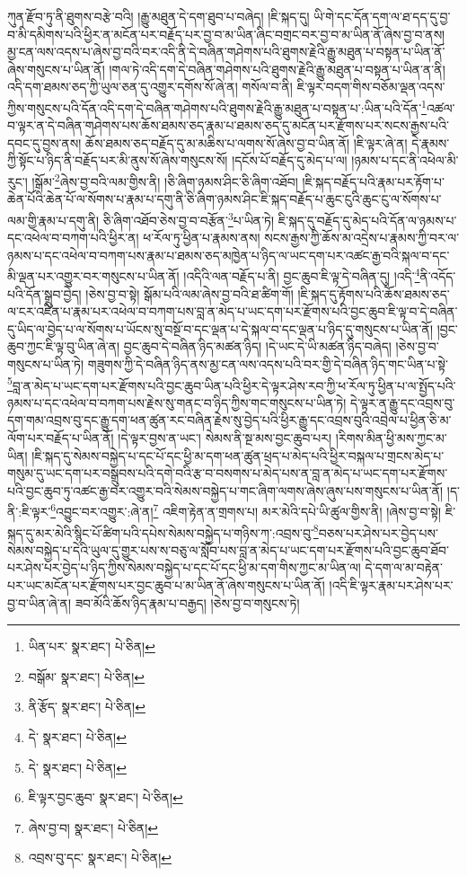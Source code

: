 ཀུན་རྫོབ་ཏུ་ནི་ཐུགས་བརྩེ་བའི། །རྒྱུ་མཐུན་དེ་དག་ཐུབ་པ་བཞེད། །ཇི་སྐད་དུ། ཡི་གེ་དང་དོན་དག་ལ་ཐ་དད་དུ་བྱ་བ་མི་དམིགས་པའི་ཕྱིར་ན་མངོན་པར་བརྗོད་པར་བྱ་བ་མ་ཡིན་ཞིང་བགྲང་བར་བྱ་བ་མ་ཡིན་ནོ་ཞེས་བྱ་བ་ནས། མྱ་ངན་ལས་འདས་པ་ཞེས་བྱ་བའི་བར་འདི་ནི་དེ་བཞིན་གཤེགས་པའི་ཐུགས་རྗེའི་རྒྱུ་མཐུན་པ་བསྟན་པ་ཡིན་ནོ་ཞེས་གསུངས་པ་ཡིན་ནོ། །གལ་ཏེ་འདི་དག་དེ་བཞིན་གཤེགས་པའི་ཐུགས་རྗེའི་རྒྱུ་མཐུན་པ་བསྟན་པ་ཡིན་ན་ནི། འདི་དག་ཐམས་ཅད་ཀྱི་ཡུལ་ཅན་དུ་འགྱུར་དགོས་སོ་ཞེ་ན། གསོལ་བ་ནི། ཇི་ལྟར་བདག་གིས་བཅོམ་ལྡན་འདས་ཀྱིས་གསུངས་པའི་དོན་འདི་དག་དེ་བཞིན་གཤེགས་པའི་ཐུགས་རྗེའི་རྒྱུ་མཐུན་པ་བསྟན་པ་:ཡིན་པའི་དོན་\footnote{ཡིན་པར་  སྣར་ཐང་།  པེ་ཅིན། }འཚལ་བ་ལྟར་ན་དེ་བཞིན་གཤེགས་པས་ཆོས་ཐམས་ཅད་རྣམ་པ་ཐམས་ཅད་དུ་མངོན་པར་རྫོགས་པར་སངས་རྒྱས་པའི་དབང་དུ་བྱས་ནས། ཆོས་ཐམས་ཅད་བརྗོད་དུ་མ་མཆིས་པ་ལགས་སོ་ཞེས་བྱ་བ་ཡིན་ནོ། །ཇི་ལྟར་ཞེ་ན། དེ་རྣམས་ཀྱི་སྟོང་པ་ཉིད་ནི་བརྗོད་པར་མི་ནུས་སོ་ཞེས་གསུངས་སོ། །དངོས་པོ་བརྗོད་དུ་མེད་པ་ལ། །ཉམས་པ་དང་ནི་འཕེལ་མི་རུང་། །སྒོམ་\footnote{བསྒོམ་  སྣར་ཐང་།  པེ་ཅིན། }ཞེས་བྱ་བའི་ལམ་གྱིས་ནི། །ཅི་ཞིག་ཉམས་ཤིང་ཅི་ཞིག་འཐོབ། །ཇི་སྐད་བརྗོད་པའི་རྣམ་པར་རྟོག་པ་ཆེན་པོའི་ཆེན་པོ་ལ་སོགས་པ་རྣམ་པ་དགུ་ནི་ཅི་ཞིག་ཉམས་ཤིང་ཇི་སྐད་བརྗོད་པ་ཆུང་ངུའི་ཆུང་ངུ་ལ་སོགས་པ་ལམ་གྱི་རྣམ་པ་དགུ་ནི། ཅི་ཞིག་འཐོབ་ཅེས་བྱ་བ་བརྩོན་\footnote{ནི་རྩོད་  སྣར་ཐང་།  པེ་ཅིན། }པ་ཡིན་ཏེ། ཇི་སྐད་དུ་བརྗོད་དུ་མེད་པའི་དོན་ལ་ཉམས་པ་དང་འཕེལ་བ་བཀག་པའི་ཕྱིར་ན། ཕ་རོལ་ཏུ་ཕྱིན་པ་རྣམས་ནས། སངས་རྒྱས་ཀྱི་ཆོས་མ་འདྲེས་པ་རྣམས་ཀྱི་བར་ལ་ཉམས་པ་དང་འཕེལ་བ་བཀག་པས་རྣམ་པ་ཐམས་ཅད་མཁྱེན་པ་ཉིད་ལ་ཡང་དག་པར་འཚང་རྒྱ་བའི་སྐལ་བ་དང་མི་ལྡན་པར་འགྱུར་བར་གསུངས་པ་ཡིན་ནོ། །འདིའི་ལན་བརྗོད་པ་ནི། བྱང་ཆུབ་ཇི་ལྟ་དེ་བཞིན་དུ། །འདི་\footnote{དེ་  སྣར་ཐང་།  པེ་ཅིན། }ནི་འདོད་པའི་དོན་སྒྲུབ་བྱེད། །ཅེས་བྱ་བ་སྟེ། སྒོམ་པའི་ལམ་ཞེས་བྱ་བའི་ཐ་ཚིག་གོ། །ཇི་སྐད་དུ་རྟོགས་པའི་ཆོས་ཐམས་ཅད་ལ་ངར་འཛིན་པ་རྣམ་པར་འཕེལ་བ་བཀག་པས་བླ་ན་མེད་པ་ཡང་དག་པར་རྫོགས་པའི་བྱང་ཆུབ་ཇི་ལྟ་བ་དེ་བཞིན་དུ་ཡིད་ལ་བྱེད་པ་ལ་སོགས་པ་ཡོངས་སུ་བསྔོ་བ་དང་ལྡན་པ་དེ་སྐལ་བ་དང་ལྡན་པ་ཉིད་དུ་གསུངས་པ་ཡིན་ནོ། །བྱང་ཆུབ་ཀྱང་ཇི་ལྟ་བུ་ཡིན་ཞེ་ན། བྱང་ཆུབ་དེ་བཞིན་ཉིད་མཚན་ཉིད། །དེ་ཡང་དེ་ཡི་མཚན་ཉིད་བཞེད། །ཅེས་བྱ་བ་གསུངས་པ་ཡིན་ཏེ། གཟུགས་ཀྱི་དེ་བཞིན་ཉིད་ནས་མྱ་ངན་ལས་འདས་པའི་བར་གྱི་དེ་བཞིན་ཉིད་གང་ཡིན་པ་སྟེ་\footnote{དེ་  སྣར་ཐང་།  པེ་ཅིན། }བླ་ན་མེད་པ་ཡང་དག་པར་རྫོགས་པའི་བྱང་ཆུབ་ཡིན་པའི་ཕྱིར་དེ་ལྟར་ཤེས་རབ་ཀྱི་ཕ་རོལ་ཏུ་ཕྱིན་པ་ལ་སྤྱོད་པའི་ཉམས་པ་དང་འཕེལ་བ་བཀག་པས་རྗེས་སུ་གནང་བ་ཉིད་ཀྱིས་གང་གསུངས་པ་ཡིན་ཏེ། དེ་ལྟར་ན་རྒྱུ་དང་འབྲས་བུ་དག་གམ་འབྲས་བུ་དང་རྒྱུ་དག་ཕན་ཚུན་རང་བཞིན་རྗེས་སུ་བྱེད་པའི་ཕྱིར་རྒྱུ་དང་འབྲས་བུའི་འབྲེལ་པ་ཕྱིན་ཅི་མ་ལོག་པར་བརྗོད་པ་ཡིན་ནོ། །དེ་ལྟར་བྱས་ན་ཡང་། སེམས་ནི་སྔ་མས་བྱང་ཆུབ་པར། །རིགས་མིན་ཕྱི་མས་ཀྱང་མ་ཡིན། །ཇི་སྐད་དུ་སེམས་བསྐྱེད་པ་དང་པོ་དང་ཕྱི་མ་དག་ཕན་ཚུན་ཕྲད་པ་མེད་པའི་ཕྱིར་བསྐལ་པ་གྲངས་མེད་པ་གསུམ་དུ་ཡང་དག་པར་བསྒྲུབས་པའི་དགེ་བའི་རྩ་བ་བསགས་པ་མེད་པས་ན་བླ་ན་མེད་པ་ཡང་དག་པར་རྫོགས་པའི་བྱང་ཆུབ་ཏུ་འཚང་རྒྱ་བར་འགྱུར་བའི་སེམས་བསྐྱེད་པ་གང་ཞིག་ལགས་ཞེས་ཞུས་པས་གསུངས་པ་ཡིན་ནོ། །ད་ནི་:ཇི་ལྟར་\footnote{ཇི་ལྟར་བྱང་ཆུབ་  སྣར་ཐང་།  པེ་ཅིན། }འབྱུང་བར་འགྱུར་:ཞེ་ན།\footnote{ཞེས་བྱ་བ།  སྣར་ཐང་།  པེ་ཅིན། } འཇིག་རྟེན་ན་གྲགས་པ། མར་མེའི་དཔེ་ཡི་ཚུལ་གྱིས་ནི། །ཞེས་བྱ་བ་སྟེ། ཇི་སྐད་དུ་མར་མེའི་སྙིང་པོ་ཚིག་པའི་དཔེས་སེམས་བསྐྱེད་པ་གཉིས་ཀ་:འབྲས་བུ་\footnote{འབྲས་བུ་དང་  སྣར་ཐང་།  པེ་ཅིན། }བཅས་པར་ཤེས་པར་བྱེད་པས་སེམས་བསྐྱེད་པ་དེའི་ཡུལ་དུ་གྱུར་པས་ས་བཅུ་ལ་སློབ་པས་བླ་ན་མེད་པ་ཡང་དག་པར་རྫོགས་པའི་བྱང་ཆུབ་ཐོབ་པར་ཤེས་པར་བྱེད་པ་ཉིད་ཀྱིས་སེམས་བསྐྱེད་པ་དང་པོ་དང་ཕྱི་མ་དག་གིས་ཀྱང་མ་ཡིན་ལ། དེ་དག་ལ་མ་བརྟེན་པར་ཡང་མངོན་པར་རྫོགས་པར་བྱང་ཆུབ་པ་མ་ཡིན་ནོ་ཞེས་གསུངས་པ་ཡིན་ནོ། །འདི་ཇི་ལྟར་རྣམ་པར་ཤེས་པར་བྱ་བ་ཡིན་ཞེ་ན། ཟབ་མོའི་ཆོས་ཉིད་རྣམ་པ་བརྒྱད། །ཅེས་བྱ་བ་གསུངས་ཏེ། 